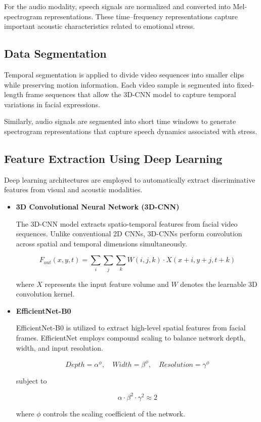 \documentclass[conference]{IEEEtran}
\begin{document}
For the audio modality, speech signals are normalized and converted into Mel-spectrogram representations. These time–frequency representations capture important acoustic characteristics related to emotional stress.

\subsection{Data Segmentation}

Temporal segmentation is applied to divide video sequences into smaller clips while preserving motion information. Each video sample is segmented into fixed-length frame sequences that allow the 3D-CNN model to capture temporal variations in facial expressions.

Similarly, audio signals are segmented into short time windows to generate spectrogram representations that capture speech dynamics associated with stress.

\subsection{Feature Extraction Using Deep Learning}

Deep learning architectures are employed to automatically extract discriminative features from visual and acoustic modalities.

\begin{itemize}

\item \textbf{3D Convolutional Neural Network (3D-CNN)}

The 3D-CNN model extracts spatio-temporal features from facial video sequences. Unlike conventional 2D CNNs, 3D-CNNs perform convolution across spatial and temporal dimensions simultaneously.

\begin{equation}
F_{out}(x,y,t) = \sum_{i}\sum_{j}\sum_{k} W(i,j,k) \cdot X(x+i,y+j,t+k)
\end{equation}

where $X$ represents the input feature volume and $W$ denotes the learnable 3D convolution kernel.

\item \textbf{EfficientNet-B0}

EfficientNet-B0 is utilized to extract high-level spatial features from facial frames. EfficientNet employs compound scaling to balance network depth, width, and input resolution.

\begin{equation}
Depth = \alpha^{\phi}, \quad Width = \beta^{\phi}, \quad Resolution = \gamma^{\phi}
\end{equation}

subject to

\begin{equation}
\alpha \cdot \beta^2 \cdot \gamma^2 \approx 2
\end{equation}

where $\phi$ controls the scaling coefficient of the network.

\end{itemize}
\end{document}
